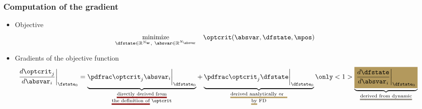 \def\PstructdispBYabsvarI{\pdfrac{\structdisp} {\absvar_i}}
\def\PmmsBYabsvarI       {\pdfrac{\mms}        {\absvar_i}}
\def\PfstateBYabsvarI    {\pdfrac{\fstate}     {\absvar_i}}


\begin{frame}
  \frametitle{Computation of the gradient}

  \begin{itemize}
    \item{Objective}
      \begin{equation*}
        \begin{aligned}
          & \underset{\dfstate \in \Rbb^{N_\wbold},~\absvar \in \Rbb^{N_\absvar}}{\text{minimize}}
          & & \optcrit(\absvar, \dfstate, \mpos)
        \end{aligned}
      \end{equation*}  
    \item Gradients of the objective function
			\begin{align*}\label{eq:sensitivity_startingpoint}
			\DoptcritJBYabsvarI\bigg\rvert_{\fstate_0}=\setulcolor{primary_0}\setul{}{2pt}
			\underbrace{\PoptcritJBYabsvarI\bigg\rvert_{\dfstate_0}}_{
			                                                        \substack{
			                                                                 \text{\ul{directly derived from}} \\
			                                                                 \text{\ul{the definition of} $\optcrit$}
			                                                                 } 
			                                                        }  +
			\underbrace{\PoptcritJBYfstate\bigg\rvert_{\dfstate_0}}_ {\setulcolor{neutral_1}
			                                                        \substack{
			                                                                 \text{\ul{derived analytically or~~}}\\
			                                                                 \text{\ul{by} FD}
			                                                                 }
			                                                        }                                             
			\only<1>{\underbrace{\hle{neutral_1}{\DfstateBYabsvarI\bigg\rvert_{\dfstate_0}}}_  {\setulcolor{neutral_2}
			                                                        \substack{
			                                                                 \text{\ul{derived from dynamic}}\\
}}}
\end{align*}
\end{itemize}
\end{frame}

